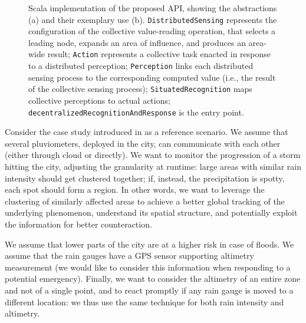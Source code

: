 \begin{figure}
\begin{subfigure}[b]{0.9\linewidth}
\end{subfigure}
\caption[Scala implementation of the dynamic decentralization domains API]{
  Scala implementation of the proposed API,
  showing the abstractions (a)
  and their exemplary use (b).
  \texttt{DistributedSensing} represents the configuration of the collective value-reading operation,
  that selects a leading node, expands an area of influence, and produces an area-wide result;
  \texttt{Action} represents a collective task enacted in response to a distributed perception;
  \texttt{Perception} links each distributed sensing process to the corresponding computed value 
  (i.e., the result of the collective sensing process);
  \texttt{SituatedRecognition} maps collective perceptions to actual actions;
  \texttt{decentralizedRecognitionAndResponse} is the entry point.
}
\label{code}
\end{figure}

Consider the \casename{} case study introduced in  as a reference scenario.
%
We assume that several pluviometers, deployed in the city, can communicate with each other (either through cloud or directly).
%
We want to monitor the progression of a storm hitting the city,
adjusting the granularity at runtime:
large areas with similar rain intensity should get clustered together;
if, instead, the precipitation is spotty, each spot should form a region.
%
In other words,
we want to leverage the clustering of similarly affected areas to achieve a better global tracking of the underlying phenomenon,
understand its spatial structure,
and potentially exploit the information for better counteraction.

We assume that lower parts of the city are at a higher risk in case of floods.
%
We assume that the rain gauges have a GPS sensor supporting altimetry measurement
 (we would like to consider this information when responding to a potential emergency).
%
Finally,
we want to consider the altimetry of an entire zone and not of a single point,
and to react promptly if any rain gauge is moved to a different location:
we thus use the same technique for both rain intensity and altimetry.

